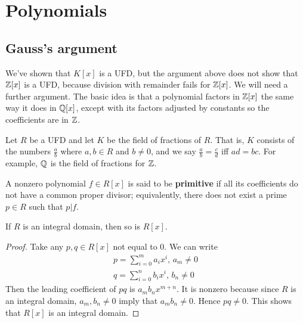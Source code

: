\chapter{Polynomials}\label{polynomials}
\section{Gauss's argument}
We've shown that $K[x]$ is a UFD, but the argument above does not show that $\mathbb{Z}[x]$ is a UFD, because division with remainder fails for $\mathbb{Z}[x]$. We will need a further argument. The basic idea is that a polynomial factors in $\mathbb{Z}[x]$ the same way it does in $\mathbb{Q}[x]$, except with its factors adjusted by constants so the coefficients are in $\mathbb{Z}$.

Let $R$ be a UFD and let $K$ be the field of fractions of $R$. That is, $K$ consists of the numbers $\frac ab$ where $a,b\in R$ and $b\neq 0$, and we say $\frac ab=\frac cd$ iff $ad=bc$. For example, $\mathbb{Q}$ is the field of fractions for $\mathbb{Z}$.

\begin{df}
A nonzero polynomial $f\in R[x]$ is said to be \textbf{primitive} if all its coefficients do not have a common proper divisor; equivalently, there does not exist a prime $p\in R$ such that $p|f$.
\end{df}

\begin{lem}\label{polyintdom}
If $R$ is an integral domain, then so is $R[x]$.
\end{lem}
\begin{proof}
Take any $p,q\in R[x]$ not equal to 0. We can write
\begin{eqnarray*}
p=\sum_{i=0}^m a_ix^i,\,a_m\neq 0\\
q=\sum_{i=0}^n b_ix^i,\, b_n\neq 0
\end{eqnarray*}
Then the leading coefficient of $pq$ is $a_mb_nx^{m+n}$. It is nonzero because since $R$ is an integral domain, $a_m,b_n\neq 0$ imply that $a_mb_n\neq 0$. Hence $pq\neq 0$. This shows that $R[x]$ is an integral domain.
\end{proof}

